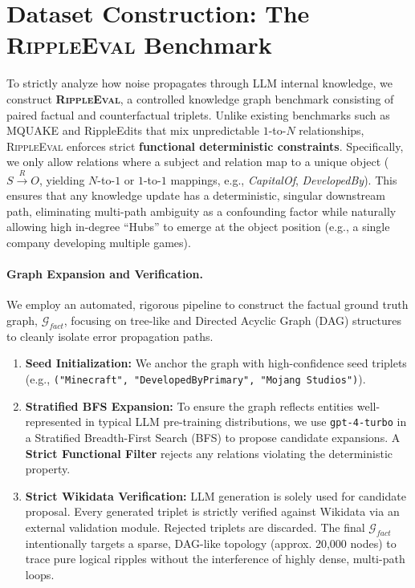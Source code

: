 \section{Dataset Construction: The \textsc{RippleEval} Benchmark}
\label{sec:dataset}


To strictly analyze how noise propagates through LLM internal knowledge, we construct \textbf{\textsc{RippleEval}}, a controlled knowledge graph benchmark consisting of paired factual and counterfactual triplets. Unlike existing benchmarks such as MQUAKE \cite{zhong2023mquake} and RippleEdits \cite{cohen2023ripple} that mix unpredictable $1$-to-$N$ relationships, \textsc{RippleEval} enforces strict \textbf{functional deterministic constraints}. Specifically, we only allow relations where a subject and relation map to a unique object ($S \xrightarrow{R} O$, yielding $N$-to-$1$ or $1$-to-$1$ mappings, e.g., \textit{CapitalOf}, \textit{DevelopedBy}). This ensures that any knowledge update has a deterministic, singular downstream path, eliminating multi-path ambiguity as a confounding factor while naturally allowing high in-degree ``Hubs'' to emerge at the object position (e.g., a single company developing multiple games).

\paragraph{Graph Expansion and Verification.}
We employ an automated, rigorous pipeline to construct the factual ground truth graph, $\mathcal{G}_{fact}$, focusing on tree-like and Directed Acyclic Graph (DAG) structures to cleanly isolate error propagation paths.
\begin{enumerate}
    \item \textbf{Seed Initialization:} We anchor the graph with high-confidence seed triplets (e.g., \texttt{("Minecraft", "DevelopedByPrimary", "Mojang Studios")}).
    \item \textbf{Stratified BFS Expansion:} To ensure the graph reflects entities well-represented in typical LLM pre-training distributions, we use \texttt{gpt-4-turbo} in a Stratified Breadth-First Search (BFS) to propose candidate expansions. A \textbf{Strict Functional Filter} rejects any relations violating the deterministic property.
    \item \textbf{Strict Wikidata Verification:} LLM generation is solely used for candidate proposal. Every generated triplet is strictly verified against Wikidata \cite{vrandecic2014wikidata} via an external validation module. Rejected triplets are discarded. The final $\mathcal{G}_{fact}$ intentionally targets a sparse, DAG-like topology (approx. 20,000 nodes) to trace pure logical ripples without the interference of highly dense, multi-path loops.
\end{enumerate}

